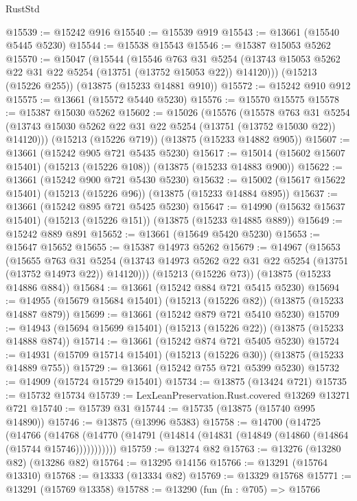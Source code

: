 \begin{lexlean}{RustStd}
\begin{coremodule}
@15539 := @15242 @916
@15540 := @15539 @919
@15543 := @13661 (@15540 @5445 @5230)
@15544 := @15538 @15543
@15546 := @15387 @15053 @5262
@15570 := @15047
    (@15544
      (@15546
        @763
        @31
        @5254
        (@13743 @15053 @5262 @22 @31 @22 @5254 (@13751 (@13752 @15053 @22)) @14120)))
    (@15213 (@15226 @255))
    (@13875 (@15233 @14881 @910))
@15572 := @15242 @910 @912
@15575 := @13661 (@15572 @5440 @5230)
@15576 := @15570 @15575
@15578 := @15387 @15030 @5262
@15602 := @15026
    (@15576
      (@15578
        @763
        @31
        @5254
        (@13743 @15030 @5262 @22 @31 @22 @5254 (@13751 (@13752 @15030 @22)) @14120)))
    (@15213 (@15226 @719))
    (@13875 (@15233 @14882 @905))
@15607 := @13661 (@15242 @905 @721 @5435 @5230)
@15617 := @15014 (@15602 @15607 @15401) (@15213 (@15226 @108)) (@13875 (@15233 @14883 @900))
@15622 := @13661 (@15242 @900 @721 @5430 @5230)
@15632 := @15002 (@15617 @15622 @15401) (@15213 (@15226 @96)) (@13875 (@15233 @14884 @895))
@15637 := @13661 (@15242 @895 @721 @5425 @5230)
@15647 := @14990 (@15632 @15637 @15401) (@15213 (@15226 @151)) (@13875 (@15233 @14885 @889))
@15649 := @15242 @889 @891
@15652 := @13661 (@15649 @5420 @5230)
@15653 := @15647 @15652
@15655 := @15387 @14973 @5262
@15679 := @14967
    (@15653
      (@15655
        @763
        @31
        @5254
        (@13743 @14973 @5262 @22 @31 @22 @5254 (@13751 (@13752 @14973 @22)) @14120)))
    (@15213 (@15226 @73))
    (@13875 (@15233 @14886 @884))
@15684 := @13661 (@15242 @884 @721 @5415 @5230)
@15694 := @14955 (@15679 @15684 @15401) (@15213 (@15226 @82)) (@13875 (@15233 @14887 @879))
@15699 := @13661 (@15242 @879 @721 @5410 @5230)
@15709 := @14943 (@15694 @15699 @15401) (@15213 (@15226 @22)) (@13875 (@15233 @14888 @874))
@15714 := @13661 (@15242 @874 @721 @5405 @5230)
@15724 := @14931 (@15709 @15714 @15401) (@15213 (@15226 @30)) (@13875 (@15233 @14889 @755))
@15729 := @13661 (@15242 @755 @721 @5399 @5230)
@15732 := @14909 (@15724 @15729 @15401)
@15734 := @13875 (@13424 @721)
@15735 := @15732 @15734
@15739 := LexLeanPreservation.Rust.covered @13269 @13271 @721
@15740 := @15739 @31
@15744 := @15735 (@13875 (@15740 @995 @14890))
@15746 := @13875 (@13996 @5383)
@15758 := @14700
    (@14725
      (@14766
        (@14768 (@14770 (@14791 (@14814 (@14831 (@14849 (@14860 (@14864 (@15744 @15746)))))))))))
@15759 := @13274 @82
@15763 := @13276 (@13280 @82) (@13286 @82)
@15764 := @13295 @14156
@15766 := @13291 (@15764 @13310)
@15768 := @13333 (@13334 @82)
@15769 := @13329 @15768
@15771 := @13291 (@15769 @13358)
@15788 := @13290
    (fun (fn : @705) =>
    @15766

\end{coremodule}
\end{lexlean}
